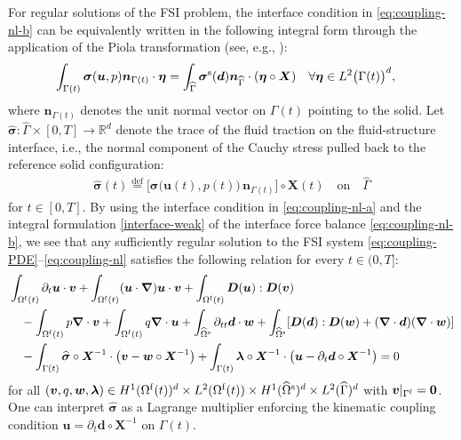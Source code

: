 \documentclass[11pt,reqno]{amsart}
\theoremstyle{definition}
\theoremstyle{plain}
\numberwithin{theorem}{section}
\numberwithin{proposition}{section}
\numberwithin{lemma}{section}
\numberwithin{equation}{section}
\newcommand{\bs}[1]{\boldsymbol{#1}}
\newcommand{\uu}[1]  {{\bs{#1}} }
\newcommand{\grad}   { \uu{\nabla}    }
\newcommand{\bv}{{\bs v}}
\newcommand{\bu}{\uu{u}}
\newcommand{\bw}{{\bs w}}
\renewcommand{\(}{\bigl(}
\renewcommand{\)}{\bigr)}
\def\eqd{\stackrel{\mathrm{def}}{=}}
\begin{document}
For regular solutions of the FSI problem, the interface condition in \eqref{eq:coupling-nl-b} can be equivalently written in the following integral form through the application of the Piola transformation (see, e.g., \cite{ciarlet-88}): 
\begin{align}\label{interface-weak}
\int_{\Gamma(t)} {\bs\sigma}({\bs u},p){\bs n}_{\Gamma(t)}\cdot{\bs\eta}
&= \int_{\widehat\Gamma} {\bs\sigma}^{\rm s}({\bs d}) {\bs n}_{\widehat\Gamma}\cdot({\bs\eta} \circ{\bs X})
\quad \forall {\bs\eta}\in L^2\big(\Gamma(t)\big)^d ,
\end{align}
where ${\bs n}_{\Gamma(t)}$ denotes the unit normal vector on $\Gamma(t)$ pointing to the solid. 
Let $\widehat{\bs\sigma} : \widehat \Gamma \times [0,T]\rightarrow \mathbb{R}^d $ denote the trace of the fluid traction on the fluid-structure interface, i.e., the normal component of the Cauchy stress pulled back to the reference solid configuration:
\begin{align}\label{def-hat-sigma}
\widehat{\bs\sigma}(t)
\eqd \big[{\bs\sigma}\big({\bs u}(t),p(t)\big)\,{\bs n}_{\Gamma(t)}\big]\circ \bs X(t)
\quad \text{on}\quad  \widehat\Gamma 
\end{align}
for $t\in[0,T]$. 
By using the interface condition in \eqref{eq:coupling-nl-a} and the integral formulation \eqref{interface-weak} of the interface force balance \eqref{eq:coupling-nl-b}, we see that any sufficiently regular solution to the FSI system \eqref{eq:coupling-PDE}–\eqref{eq:coupling-nl} satisfies the following relation for every $t\in(0,T]$: 
\begin{equation}\label{eq:weak-fsi}
\begin{aligned}
&\int_{\Omega^{\rm f}(t)} \partial_t \bu \cdot \bv
+ \int_{\Omega^{\rm f}(t) } (\bu\cdot\bs \nabla)\bu \cdot \bv
+ \int_{\Omega^{\rm f}(t)} \bs D(\bu):\bs D(\bv) \\
&\quad - \int_{\Omega^{\rm f}(t)} p\bs \nabla\cdot \bv
+ \int_{\Omega^{\rm f}(t)} q\bs \nabla\cdot  \bu
+ \int_{\widehat{\Omega}^{\rm s}} \partial_{tt}{\bs d} \cdot \bw
+ \int_{\widehat{\Omega}^{\rm s}} [{\bs D}({\bs d}) : {\bs D}({\bs w}) + (\grad\cdot{\bs d})(\grad\cdot{\bs w}) ] \\
&\quad - \int_{\Gamma(t)} \widehat{\bs\sigma}\circ \bs X^{-1}
\cdot \big(\bv - \bw\circ \bs X^{-1}\big)
+ \int_{\Gamma(t)} \bs\lambda\circ \bs X^{-1}
\cdot \big(\bu - \partial_t{\bs d}\circ \bs X^{-1}\big) = 0 
\end{aligned}
\end{equation}
for all $(\bv,q,\bw,\bs\lambda)\in H^1(\Omega^{\rm f}(t))^d
\times L^2(\Omega^{\rm f}(t))
\times H^1(\widehat{\Omega}^{\rm s})^d
\times L^2(\widehat\Gamma)^d$ with  ${\bs v}\vert_{\Gamma^{\rm f}} = {\bs 0}$. %
One can interpret  $\widehat{\bs\sigma}$ as a Lagrange multiplier enforcing the kinematic coupling condition
${\bs u} = \partial_t{\bs d}\circ {\bs X}^{-1} $ on $\Gamma(t)$.
\end{document}
